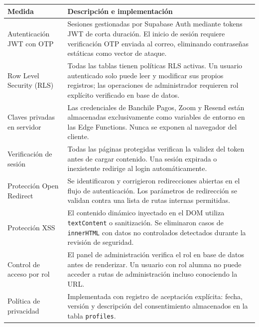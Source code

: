 \documentclass[a4paper,11pt]{article}
\begin{document}
\renewcommand{\arraystretch}{1.3}
\begin{longtable}{L{4cm} L{10.5cm}}
\toprule
\textbf{Medida} & \textbf{Descripci\'on e implementaci\'on} \\
\midrule
\endhead
\bottomrule
\endfoot

Autenticaci\'on JWT con OTP &
  Sesiones gestionadas por Supabase Auth mediante tokens JWT de corta
  duraci\'on. El inicio de sesi\'on requiere verificaci\'on OTP enviada
  al correo, eliminando contrase\~nas est\'aticas como vector de ataque. \\

Row Level Security (RLS) &
  Todas las tablas tienen pol\'iticas RLS activas. Un usuario autenticado
  solo puede leer y modificar sus propios registros; las operaciones de
  administrador requieren rol expl\'icito verificado en base de datos. \\

Claves privadas en servidor &
  Las credenciales de Banchile Pagos, Zoom y Resend est\'an almacenadas
  exclusivamente como variables de entorno en las Edge Functions.
  Nunca se exponen al navegador del cliente. \\

Verificaci\'on de sesi\'on &
  Todas las p\'aginas protegidas verifican la validez del token antes
  de cargar contenido. Una sesi\'on expirada o inexistente redirige
  al login autom\'aticamente. \\

Protecci\'on Open Redirect &
  Se identificaron y corrigieron redirecciones abiertas en el flujo de
  autenticaci\'on. Los par\'ametros de redirecci\'on se validan contra
  una lista de rutas internas permitidas. \\

Protecci\'on XSS &
  El contenido din\'amico inyectado en el DOM utiliza \texttt{textContent}
  o sanitizaci\'on. Se eliminaron casos de \texttt{innerHTML} con datos
  no controlados detectados durante la revisi\'on de seguridad. \\

Control de acceso por rol &
  El panel de administraci\'on verifica el rol en base de datos antes
  de renderizar. Un usuario con rol alumna no puede acceder a rutas de
  administraci\'on incluso conociendo la URL. \\

Pol\'itica de privacidad &
  Implementada con registro de aceptaci\'on expl\'icita: fecha,
  versi\'on y descripci\'on del consentimiento almacenados en la
  tabla \texttt{profiles}. \\

\end{longtable}
\end{document}
